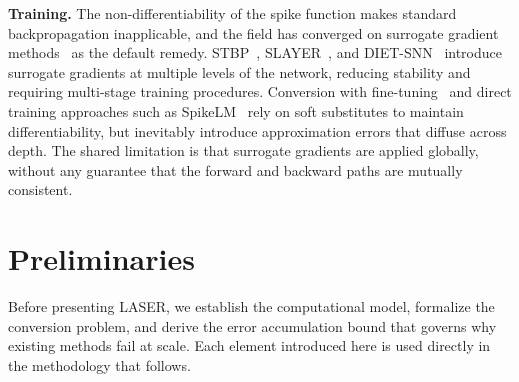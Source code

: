\documentclass{article}
\theoremstyle{plain}
\theoremstyle{definition}
\theoremstyle{remark}
\begin{document}
\noindent\textbf{Training.}
The non-differentiability of the spike function makes standard backpropagation
inapplicable, and the field has converged on surrogate gradient
methods~\citep{neftci2019surrogate,wu2018stbp,shrestha2018slayer} as the default
remedy. STBP~\citep{wu2018stbp}, SLAYER~\citep{shrestha2018slayer}, and
DIET-SNN~\citep{rathi2021dietsnn} introduce surrogate gradients at multiple levels of
the network, reducing stability and requiring multi-stage training procedures.
Conversion with fine-tuning~\citep{rathi2020hybrid} and direct training approaches
such as SpikeLM~\citep{xing2024spikelm} rely on soft substitutes to maintain
differentiability, but inevitably introduce approximation errors that diffuse across
depth. The shared limitation is that surrogate gradients are applied globally,
without any guarantee that the forward and backward paths are mutually consistent.



\section{Preliminaries}
\label{sec:preliminaries}

Before presenting LASER, we establish the computational model, formalize the
conversion problem, and derive the error accumulation bound that governs why existing
methods fail at scale. Each element introduced here is used directly in the
methodology that follows.
\end{document}
